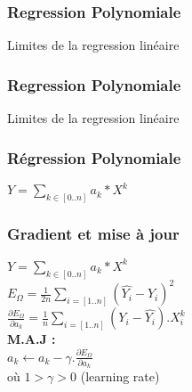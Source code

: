 
\begin{frame}
  \frametitle{Regression Polynomiale}
  Limites de la regression linéaire
\end{frame}

\begin{frame}
  \frametitle{Regression Polynomiale}
  Limites de la regression linéaire
\end{frame}

\begin{frame}
  \frametitle{Régression Polynomiale}
  \begin{minipage}[l]{0.25\linewidth}
    $Y=\underset{k \in [0..n]}{\sum}{a_k*X^k}$
  \end{minipage}\hfill
  \begin{minipage}[c]{0.74\linewidth}
  \end{minipage}\hfill
\end{frame}

\begin{frame}
  \frametitle{Gradient et mise à jour}
  $Y=\underset{k \in [0..n]}{\sum}{a_k*X^k}$ \\
  $\;$ \\
  $E_{\Omega} = \frac{1}{2n}\underset{i=[1..n]}{\sum}( \hat{Y_i} - Y_i )^2$ \\
  $\;$ \\
  $\frac{\partial{E_{\Omega}}}{\partial{a_k}} = \frac{1}{n}\underset{i=[1..n]}{\sum}(Y_i - \hat{Y_i}).X_i^k$ \\
  $\;$ \\
  $\;$ \\
  \textbf{M.A.J :} \\
  $\;$ \\
  $a_k \leftarrow a_k - \gamma.\frac{\partial{E_{\Omega}}}{\partial{a_k}}$ \\
  $\;$ \\
  où $1 > \gamma > 0$ (learning rate)
\end{frame}